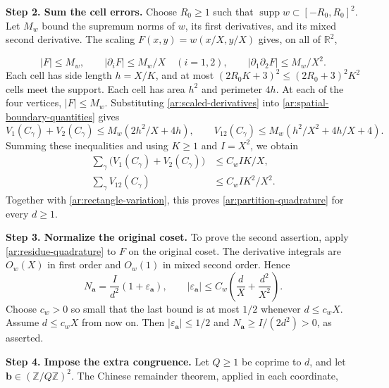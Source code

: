 \documentclass[twoside]{aomart}
\makeatletter
\theoremstyle{paperplain}
\theoremstyle{paperdefinition}
\renewenvironment{proof}[1][\proofname]{\par\pushQED{\qed}%
  \normalfont\topsep6\p@\@plus3\p@\relax\trivlist
  \item[\hskip\labelsep\itshape #1\@addpunct{.}]\ignorespaces
}{\popQED\endtrivlist\@endpefalse}
\newcommand{\Z}{\mathbb Z}
\newcommand{\R}{\mathbb R}
\numberwithin{equation}{section}
\makeatother
\begin{document}
\begin{proof}
\par
\medskip
\noindent\textbf{Step 2. Sum the cell errors.}
Choose $R_0\ge1$ such that
$\operatorname{supp}w\subset[-R_0,R_0]^2$.
Let $M_w$ bound the supremum norms of $w$, its first
derivatives, and its mixed second derivative.
The scaling $F(x,y)=w(x/X,y/X)$ gives, on all of $\R^2$,

\begin{equation}
 |F|\le M_w,\qquad |\partial_iF|\le M_w/X\quad(i=1,2),
 \qquad |\partial_1\partial_2F|\le M_w/X^2.
 \label{ar:scaled-derivatives}
\end{equation}
Each cell has side length $h=X/K$, and at most
$(2R_0K+3)^2\le(2R_0+3)^2K^2$ cells meet the support.
Each cell has area $h^2$ and perimeter $4h$.
At each of the four vertices, $|F|\le M_w$.
Substituting \eqref{ar:scaled-derivatives} into
\eqref{ar:spatial-boundary-quantities} gives
\begin{equation}
 V_1(C_\gamma)+V_2(C_\gamma)\le M_w(2h^2/X+4h),\qquad
 V_{12}(C_\gamma)\le M_w(h^2/X^2+4h/X+4).
\end{equation}
Summing these inequalities and using $K\ge1$ and $I=X^2$, we obtain
\begin{equation}
 \begin{aligned}
 \sum_\gamma\bigl(V_1(C_\gamma)+V_2(C_\gamma)\bigr)
   &\le C_wIK/X,\\
 \sum_\gamma V_{12}(C_\gamma)
   &\le C_wIK^2/X^2.
 \end{aligned}
\end{equation}
Together with \eqref{ar:rectangle-variation}, this proves
\eqref{ar:partition-quadrature} for every $d\ge1$.
\par
\medskip
\noindent\textbf{Step 3. Normalize the original coset.}
To prove the second assertion, apply
\eqref{ar:residue-quadrature} to $F$ on the original coset.
The derivative integrals are $O_w(X)$ in first order and
$O_w(1)$ in mixed second order. Hence
\begin{equation}
 N_{\mathbf a}=\frac I{d^2}(1+\varepsilon_{\mathbf a}),
 \qquad |\varepsilon_{\mathbf a}|
       \le C_w\left(\frac dX+\frac{d^2}{X^2}\right).
\end{equation}
Choose $c_w>0$ so small that the last bound is at most $1/2$
whenever $d\le c_wX$.
Assume $d\le c_wX$ from now on. Then
$|\varepsilon_{\mathbf a}|\le1/2$ and
$N_{\mathbf a}\ge I/(2d^2)>0$, as asserted.
\par
\medskip
\noindent\textbf{Step 4. Impose the extra congruence.}
Let $Q\ge1$ be coprime to $d$, and let
$\mathbf b\in(\Z/Q\Z)^2$.
The Chinese remainder theorem, applied in each coordinate,

\end{proof}
\end{document}
